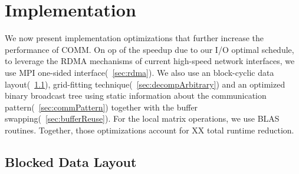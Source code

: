 \documentclass[sigplan,review,anonymous,10pt]{acmart}\settopmatter{printfolios=true,printccs=false,printacmref=false}
\begin{document}

\section{Implementation}
\label{sec:implementation}
We now present implementation optimizations that further 
increase the performance of COMM. On op of the speedup due to our I/O optimal 
schedule, to leverage the RDMA mechanisms of 
current high-speed network interfaces, we use MPI one-sided 
interface(~\cref{sec:rdma}). We also use an block-cyclic data 
layout(~\cref{sec:datalayout}), grid-fitting 
technique(~\cref{sec:decompArbitrary}) and an optimized binary broadcast 
tree using static information about
the communication pattern(~\cref{sec:commPattern}) together with the buffer 
swapping(~\cref{sec:bufferReuse}). For the local matrix operations, we use 
BLAS routines. Together, those optimizations account 
for XX total runtime 
reduction. 

\subsection{Blocked Data Layout}
\label{sec:datalayout}
\end{document}
